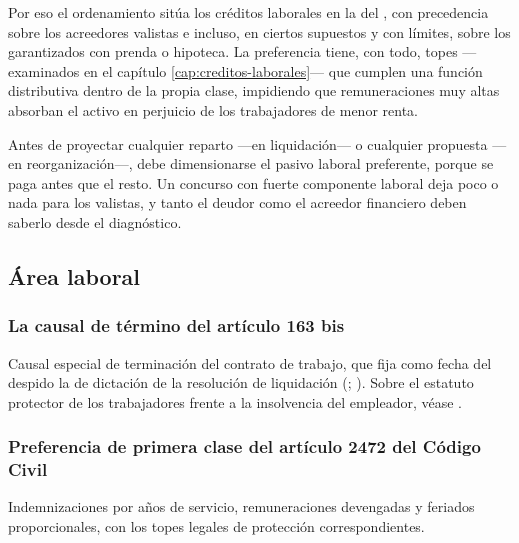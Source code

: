 Por eso el ordenamiento sitúa los créditos laborales en la  del
 \citeyearpar{codigo-civil}, con precedencia sobre los acreedores valistas e
incluso, en ciertos supuestos y con límites, sobre los garantizados con prenda o hipoteca. La
preferencia tiene, con todo, topes ---examinados en el capítulo \ref{cap:creditos-laborales}---
que cumplen una función distributiva dentro de la propia clase, impidiendo que remuneraciones
muy altas absorban el activo en perjuicio de los trabajadores de menor renta.

\begin{foco}
Antes de proyectar cualquier reparto ---en liquidación--- o cualquier propuesta ---en
reorganización---, debe dimensionarse el pasivo laboral preferente, porque se paga antes que
el resto. Un concurso con fuerte componente laboral deja poco o nada para los valistas, y
tanto el deudor como el acreedor financiero deben saberlo desde el diagnóstico.
\end{foco}

\bloqueNormativo

\subsection{Área laboral}

\subsubsection{La causal de término del artículo 163 bis}

Causal especial de terminación del contrato de trabajo, que fija como fecha del despido
la de dictación de la resolución de liquidación (;
\cite{codigo-trabajo}). Sobre el estatuto protector de los trabajadores frente a la
insolvencia del empleador, véase \textcite{doc-proteccion-trabajadores}.

\subsubsection{Preferencia de primera clase del artículo 2472 del Código Civil}

Indemnizaciones por años de servicio, remuneraciones devengadas y feriados
proporcionales, con los topes legales de protección
correspondientes.

